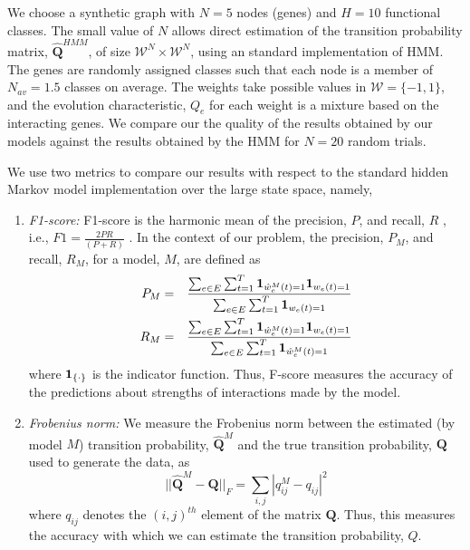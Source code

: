 \documentclass{bioinfo}
\begin{document}
We choose a synthetic graph with $N=5$ nodes (genes) and $H=10$ functional
classes. The small value of $N$ allows direct estimation of the
transition probability matrix, $\hat{\mathbf Q}^{HMM}$,  of size ${\mathcal W}^{N} \times {\mathcal W}^{N}$,
using an standard implementation of HMM. %
The genes are randomly assigned classes  such that each
node is a member of $N_{av}=1.5$ classes on average. The weights take
possible values in ${\mathcal W} = \{-1, 1\}$, and the evolution characteristic, $Q_{e}$ for
each weight is a mixture based on the interacting genes.  We compare
our the quality of the results obtained by our models against the
results obtained by the HMM for $N=20$ random trials. 


We use two metrics to compare our results with respect to the standard
hidden Markov model implementation over the large state space, namely, 
\begin{enumerate}
\item \emph{F1-score:} F1-score is the harmonic mean of the precision, $P$,
   and recall, $R$ , i.e., $F1 =\frac{2 P R}{(P + R)}$
    . In the context of our problem, the precision, $P_{M}$, and
  recall, $R_{M}$,  for a model, $M$, are defined as
  \begin{eqnarray}
    \label{eq:f-score}
    P_{M} &=& \frac{\sum_{e
  \in E} \sum_{t=1}^{T} {\bf 1}_{\hat{w}^{M}_{e}(t) = 1 } {\bf 1}_{w_{e}(t) = 1 } } {\sum_{e
  \in E} \sum_{t=1}^{T} {\bf 1}_{w_{e}(t) = 1 }} \\
R_{M} &=&  \frac{\sum_{e
  \in E} \sum_{t=1}^{T} {\bf 1}_{\hat{w}^{M}_{e}(t) = 1 } {\bf 1}_{w_{e}(t) = 1 } } {\sum_{e
  \in E} \sum_{t=1}^{T} {\bf 1}_{\hat{w}^{M}_{e}(t) = 1 }}
  \end{eqnarray}
 where ${\bf 1}_{\{\cdot\}}$ is the indicator function. Thus, F-score measures the accuracy of the predictions about strengths of
 interactions made by the model.
\item \emph{Frobenius norm:} We measure the Frobenius norm between the
  estimated (by model $M$) transition probability, $\hat{\mathbf
    Q}^{M}$ and the true transition probability, $\mathbf Q$ used to
  generate the data, as
  \begin{equation}
    \label{eq:f-norm}
    || \hat{\mathbf Q}^{M} - {\mathbf Q} ||_{F} = \sum_{i, j} |q_{ij}^{M} - q_{ij}|^{2}
  \end{equation}
 where $q_{ij}$ denotes the $(i,j)^{th}$ element of the matrix
 $\mathbf Q$. Thus, this measures the accuracy with which we can estimate the
 transition probability, $Q$. 
\end{enumerate}
\end{document}
